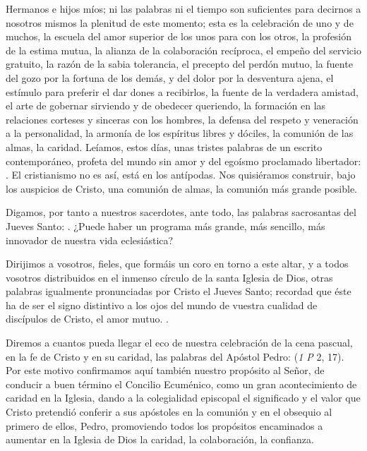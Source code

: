 \begin{body}
Hermanos e hijos míos; ni las palabras ni el tiempo son suficientes para decirnos a nosotros mismos la plenitud de este momento; esta es la celebración de uno y de muchos, la escuela del amor superior de los unos para con los otros, la profesión de la estima mutua, la alianza de la colaboración recíproca, el empeño del servicio gratuito, la razón de la sabia tolerancia, el precepto del perdón mutuo, la fuente del gozo por la fortuna de los demás, y del dolor por la desventura ajena, el estímulo para preferir el dar dones a recibirlos, la fuente de la verdadera amistad, el arte de gobernar sirviendo y de obedecer queriendo, la formación en las relaciones corteses y sinceras con los hombres, la defensa del respeto y veneración a la personalidad, la armonía de los espíritus libres y dóciles, la comunión de las almas, la caridad. Leíamos, estos días, unas tristes palabras de un escrito contemporáneo, profeta del mundo sin amor y del egoísmo proclamado libertador: . El cristianismo no es así, está en los antípodas. Nos quisiéramos construir, bajo los auspicios de Cristo, una comunión de almas, la comunión más grande posible.

Digamos, por tanto a nuestros sacerdotes, ante todo, las palabras sacrosantas del Jueves Santo: . ¿Puede haber un programa más grande, más sencillo, más innovador de nuestra vida eclesiástica?

Dirijimos a vosotros, fieles, que formáis un coro en torno a este altar, y a todos vosotros distribuidos en el inmenso círculo de la santa Iglesia de Dios, otras palabras igualmente pronunciadas por Cristo el Jueves Santo; recordad que éste ha de ser el signo distintivo a los ojos del mundo de vuestra cualidad de discípulos de Cristo, el amor mutuo. .

Diremos a cuantos pueda llegar el eco de nuestra celebración de la cena pascual, en la fe de Cristo y en su caridad, las palabras del Apóstol Pedro:  (\textit{1 P} 2, 17). Por este motivo confirmamos aquí también nuestro propósito al Señor, de conducir a buen término el Concilio Ecuménico, como un gran acontecimiento de caridad en la Iglesia, dando a la colegialidad episcopal el significado y el valor que Cristo pretendió conferir a sus apóstoles en la comunión y en el obsequio al primero de ellos, Pedro, promoviendo todos los propósitos encaminados a aumentar en la Iglesia de Dios la caridad, la colaboración, la confianza.


\end{body}
